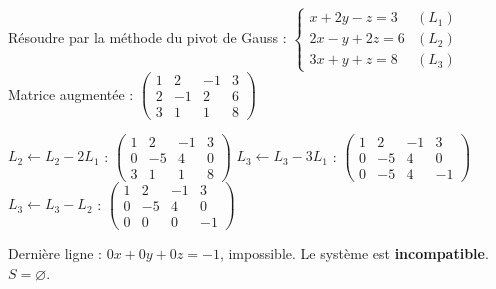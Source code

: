 \documentclass[11pt]{article}
\begin{document}
\begin{exoresolu}
Résoudre par la méthode du pivot de Gauss :
$\begin{cases}
x + 2y - z = 3 & (L_1)\\
2x - y + 2z = 6 & (L_2)\\
3x + y + z = 8 & (L_3)
\end{cases}$
\tcblower
Matrice augmentée :
$\left( \begin{array}{ccc|c}
1 & 2 & -1 & 3 \\
2 & -1 & 2 & 6 \\
3 & 1 & 1 & 8
\end{array} \right)$

$L_2 \leftarrow L_2 - 2L_1$ : $\left( \begin{array}{ccc|c} 1 & 2 & -1 & 3 \\ 0 & -5 & 4 & 0 \\ 3 & 1 & 1 & 8 \end{array} \right)$
$L_3 \leftarrow L_3 - 3L_1$ : $\left( \begin{array}{ccc|c} 1 & 2 & -1 & 3 \\ 0 & -5 & 4 & 0 \\ 0 & -5 & 4 & -1 \end{array} \right)$
$L_3 \leftarrow L_3 - L_2$ : $\left( \begin{array}{ccc|c} 1 & 2 & -1 & 3 \\ 0 & -5 & 4 & 0 \\ 0 & 0 & 0 & -1 \end{array} \right)$

Dernière ligne : $0x + 0y + 0z = -1$, impossible.
Le système est \textbf{incompatible}.
$S = \varnothing$.
\end{exoresolu}
\end{document}

